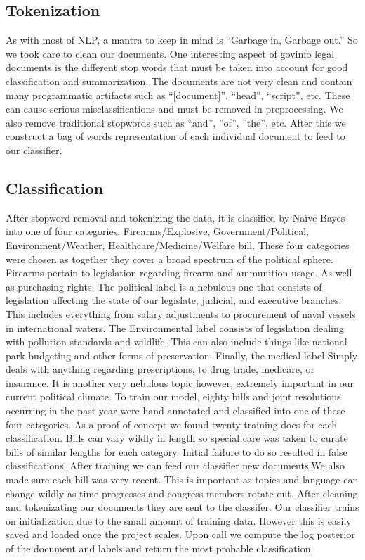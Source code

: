 \documentclass[11pt,a4paper]{article}
\begin{document}
\subsection{Tokenization}
As with most of NLP, a mantra to keep in mind is “Garbage in, Garbage out.” So we took care to clean our documents. One interesting aspect of govinfo legal documents is the different stop words that must be taken into account for good classification and summarization. The documents are not very clean and contain many programmatic artifacts such as “[document]”, “head”, “script”, etc. These can cause serious misclassifications and must be removed in preprocessing. We also remove traditional stopwords such as “and”, ”of”, ”the”, etc. After this we construct a bag of words representation of each individual document to feed to our classifier. 

\subsection{Classification}
After stopword removal and tokenizing the data, it is classified by Naïve Bayes into one of four categories. Firearms/Explosive, Government/Political, Environment/Weather, Healthcare/Medicine/Welfare bill. These four categories were chosen as together they cover a broad spectrum of the political sphere. Firearms pertain to legislation regarding firearm and ammunition usage. As well as  purchasing rights. The political label is a nebulous one that consists of legislation affecting the state of our legislate, judicial, and executive branches. This includes everything from salary adjustments to procurement of naval vessels in international waters. The Environmental label consists of legislation dealing with pollution standards and wildlife. This can also include things like national park budgeting and other forms of preservation. Finally, the medical label Simply deals with anything regarding prescriptions, to drug trade, medicare, or insurance. It is another very nebulous topic however, extremely important in our current political climate. To train our model, eighty bills and joint resolutions occurring in the past year were hand annotated and classified into one of these four categories. As a proof of concept we found twenty training docs for each classification. Bills can vary wildly in length so special care was taken to curate bills of similar lengths for each category. Initial failure to do so resulted in false classifications. After training we can feed our classifier new documents.We also made sure each bill was very recent. This is important as topics and language can change wildly as time progresses and congress members rotate out. After cleaning and tokenizating our documents they are sent to the classifer. Our classifier trains on initialization due to the small amount of training data. However this is easily saved and loaded once the project scales. Upon call we compute the log posterior of the document and labels and return the most probable classification. 
\end{document}
